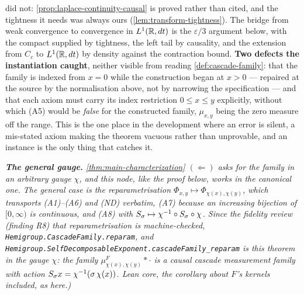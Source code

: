 \begin{theorem}
{did not: \ref{prop:laplace-continuity-causal} is proved rather than cited, and the tightness it
needs was always ours (\ref{lem:transform-tightness}). The bridge from weak convergence to
convergence in $L^1(\mathbb{R}, dt)$ is the $\varepsilon/3$ argument below, with the compact supplied by
tightness, the left tail by causality, and the extension from $C_c$ to $L^1(\mathbb{R}, dt)$ by density
against the contraction bound.
\textbf{Two defects the instantiation caught}, neither visible from reading
\ref{def:cascade-family}: that the family is indexed from $x = 0$ while the construction began
at $x > 0$ --- repaired at the source by the normalisation above, not by narrowing the
specification --- and that each axiom must carry its index restriction $0 \le x \le y$
explicitly, without which (A5) would be \emph{false} for the constructed family, $\mu_{x,y}$
being the zero measure off the range. This is the one place in the development where an error is
silent, a mis-stated axiom making the theorem vacuous rather than unprovable, and an instance is
the only thing that catches it.}

\emph{\textbf{The general gauge.} \ref{thm:main-characterization} $(\Leftarrow)$ asks for the
family in an \emph{arbitrary} gauge $\chi$, and this node, like the proof below, works in the
canonical one. The general case is the reparametrisation
$\Phi_{x,y} \mapsto \Phi_{\chi(x),\chi(y)}$, which transports (A1)--(A6) and (ND) verbatim, (A7)
because an increasing bijection of $[0,\infty)$ is continuous, and (A8) with
$S_\sigma \mapsto \chi^{-1} \circ S_\sigma \circ \chi$. Since the fidelity review (finding
R8) that reparametrisation is machine-checked, \texttt{Hemigroup.CascadeFamily.reparam}, and
\texttt{Hemigroup.SelfDecomposableExponent.cascadeFamily\_reparam} is this theorem in the gauge
$\chi$: the family $\mu^F_{\chi(x),\chi(y)} * \cdot$ is a causal cascade measurement family with
action $S_\sigma x = \chi^{-1}(\sigma\,\chi(x))$. Lean core, the corollary about $F$'s kernels
included, as here.)}
\end{theorem}

